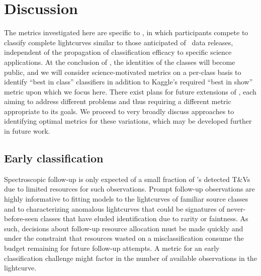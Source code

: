 \section{Discussion}
\label{sec:discussion}

The metrics investigated here are specific to \plasticc, in which participants compete to classify complete lightcurves similar to those anticipated of \lsst\ data releases, independent of the propagation of classification efficacy to specific science applications.
At the conclusion of \plasticc, the identities of the classes will become public, and we will consider science-motivated metrics on a per-class basis to identify ``best in class'' classifiers in addition to Kaggle's required ``best in show'' metric upon which we focus here.
There exist plans for future extensions of \plasticc, each aiming to address different problems and thus requiring a different metric appropriate to its goals.
We proceed to very broadly discuss approaches to identifying optimal metrics for these variations, which may be developed further in future work.

\subsection{Early classification}
\label{sec:early}

Spectroscopic follow-up is only expected of a small fraction of \lsst's detected T\&Vs due to limited resources for such observations.
Prompt follow-up observations are highly informative to fitting models to the lightcurves of familiar source classes and to characterizing anomalous lightcurves that could be signatures of never-before-seen classes that have eluded identification due to rarity or faintness.
As such, decisions about follow-up resource allocation must be made quickly and under the constraint that resources wasted on a misclassification consume the budget remaining for future follow-up attempts.
A metric for an early classification challenge might factor in the number of available observations in the lightcurve.


